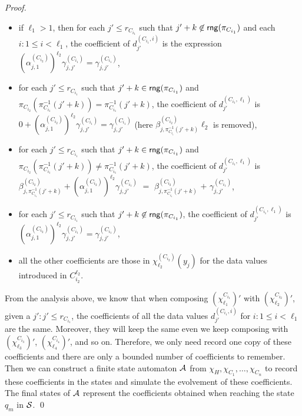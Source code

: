 \begin{proof}
\begin{itemize}
%
\item if $\ell_1>1$, then for each $j' \le r_{C_{i_1}}$ such that $j'+k \not \in \mathsf{rng}(\pi_{C_{i_1}})$ and each $i: 1 \le i < \ell_1$, the coefficient of $d^{(C_{i_1},i)}_{j'}$ is the expression $(\alpha^{(C_{i_2})}_{j,1})^{\ell_2} \gamma^{(C_{i_1})}_{j,j'} = \gamma^{(C_{i_1})}_{j,j'}$,
%
\item for each $ j' \le r_{C_{i_1}}$ such that $j'+k \in \mathsf{rng}(\pi_{C_{i_1}})$ and $\pi_{C_{i_2}}(\pi^{-1}_{C_{i_1}}(j'+k))=\pi^{-1}_{C_{i_1}}(j'+k)$, the coefficient of $d^{(C_{i_1},\ell_1)}_{j'}$ is $0 + (\alpha^{(C_{i_2})}_{j,1})^{\ell_2} \gamma^{(C_{i_1})}_{j,j'} = \gamma^{(C_{i_1})}_{j,j'}$ (here $\beta^{(C_{i_2})}_{j, \pi^{-1}_{C_{i_1}}(j'+k)} \ell_2$ is removed),
%
\item for each $ j' \le r_{C_{i_1}}$ such that $j'+k \in \mathsf{rng}(\pi_{C_{i_1}})$ and $\pi_{C_{i_2}}(\pi^{-1}_{C_{i_1}}(j'+k)) \neq \pi^{-1}_{C_{i_1}}(j'+k)$, the coefficient of $d^{(C_{i_1},\ell_1)}_{j'}$ is $\beta^{(C_{i_2})}_{j, \pi^{-1}_{C_{i_1}}(j'+k)} + (\alpha^{(C_{i_2})}_{j,1})^{\ell_2} \gamma^{(C_{i_1})}_{j,j'}$ $=$ $\beta^{(C_{i_2})}_{j, \pi^{-1}_{C_{i_1}}(j'+k)}$ $+$ $\gamma^{(C_{i_1})}_{j,j'}$,
%
\item for each $j' \le r_{C_{i_1}}$ such that $j'+k \not \in \mathsf{rng}(\pi_{C_{i_1}})$, the coefficient of $d^{(C_{i_1},\ell_1)}_{j'}$ is $(\alpha^{(C_{i_2})}_{j,1})^{\ell_2} \gamma^{(C_{i_1})}_{j,j'} = \gamma^{(C_{i_1})}_{j,j'}$,
%
\item all the other coefficients are those in $\chi^{(C_{i_2})}_{\ell_2}(y_j)$ for the data values introduced in $C^{\ell_2}_{i_2}$.
\end{itemize} 
From the analysis above, we know that when composing $(\chi^{C_{i_1}}_{\ell_1})'$ with $(\chi^{C_{i_2}}_{\ell_2})'$, given a $j': j' \le r_{C_{i_1}}$, the coefficients of all the data values $d^{(C_{i_1},i)}_{j'}$ for $i: 1 \le i < \ell_1$ are the same. Moreover, they will keep the same even we keep composing with $(\chi^{C_{i_3}}_{\ell_3})'$, $(\chi^{C_{i_4}}_{\ell_4})'$, and so on. Therefore, we only need record one copy of these coefficients and there are only a bounded number of coefficients to remember. Then we can construct a finite state automaton ${\mathcal{A} }$ from $\chi_H,\chi_{C_1},\dots,\chi_{C_n}$ to record these coefficients in the states and simulate the evolvement of these coefficients. The final states of ${\mathcal{A} }$ represent the coefficients obtained when reaching the state $q_m$ in ${\mathcal{S} }$. \qed
\end{proof}

\medskip 

